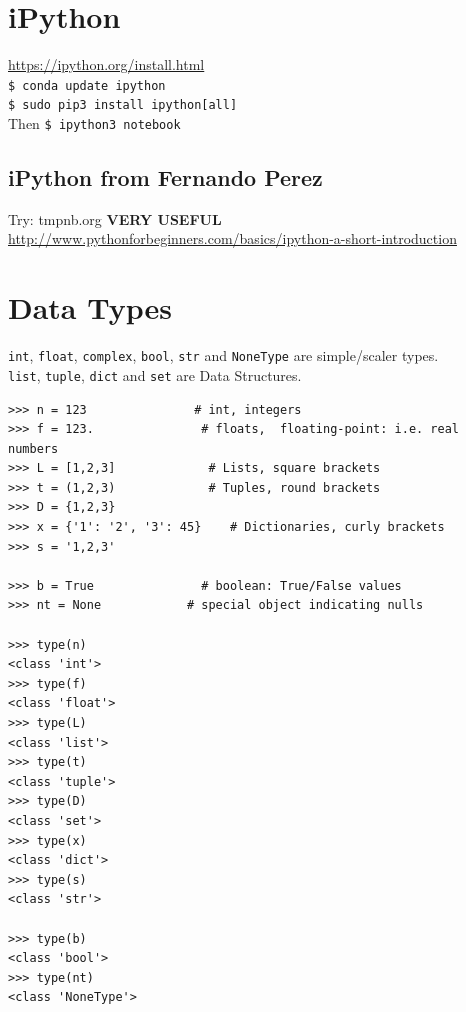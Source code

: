 \documentclass[11pt,a4paper]{article}
\begin{document}
\newpage
\section{iPython}
\href{https://ipython.org/install.html}{https://ipython.org/install.html}\\

\smallskip
\smallskip
\noindent
{\tt \$ conda update ipython}\\

\smallskip
\smallskip
\noindent
{\tt \$ sudo pip3 install ipython[all] }\\
Then
{\tt \$ ipython3 notebook}\\

    \subsection{iPython from Fernando Perez}
    Try: tmpnb.org  {\bf VERY USEFUL}\\
    \href{http://www.pythonforbeginners.com/basics/ipython-a-short-introduction}{http://www.pythonforbeginners.com/basics/ipython-a-short-introduction}




\newpage
\section{Data Types}
{\tt int}, {\tt float}, {\tt complex}, {\tt bool}, {\tt str} and {\tt NoneType} are simple/scaler types. \\
{\tt list}, {\tt tuple}, {\tt dict} and {\tt set} are Data Structures. \\

\begin{lstlisting}
>>> n = 123               # int, integers
>>> f = 123.               # floats,  floating-point: i.e. real numbers
>>> L = [1,2,3]             # Lists, square brackets
>>> t = (1,2,3)             # Tuples, round brackets
>>> D = {1,2,3}               
>>> x = {'1': '2', '3': 45}    # Dictionaries, curly brackets
>>> s = '1,2,3'

>>> b = True               # boolean: True/False values
>>> nt = None            # special object indicating nulls

>>> type(n)
<class 'int'>
>>> type(f)
<class 'float'>
>>> type(L)
<class 'list'>
>>> type(t)
<class 'tuple'>
>>> type(D)
<class 'set'>
>>> type(x)
<class 'dict'>
>>> type(s)
<class 'str'>

>>> type(b)
<class 'bool'>
>>> type(nt)
<class 'NoneType'>
\end{lstlisting}
\end{document}

